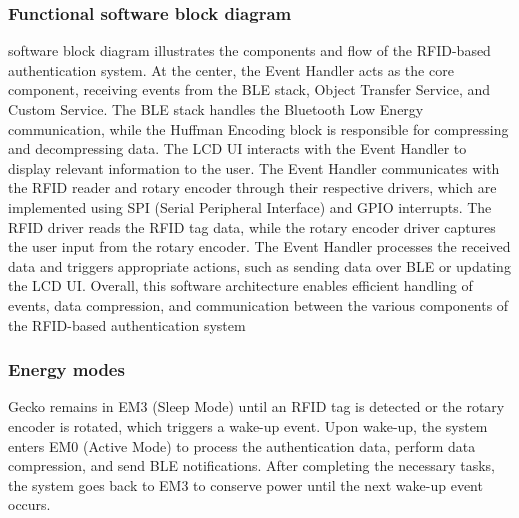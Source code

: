 \documentclass[a4paper,11pt]{article}%
\begin{document}

\subsubsection{Functional software block diagram}


software block diagram illustrates the components and flow of the RFID-based authentication system. At the center, the Event Handler acts as the core component, receiving events from the BLE stack, Object Transfer Service, and Custom Service. The BLE stack handles the Bluetooth Low Energy communication, while the Huffman Encoding block is responsible for compressing and decompressing data. The LCD UI interacts with the Event Handler to display relevant information to the user. The Event Handler communicates with the RFID reader and rotary encoder through their respective drivers, which are implemented using SPI (Serial Peripheral Interface) and GPIO interrupts. The RFID driver reads the RFID tag data, while the rotary encoder driver captures the user input from the rotary encoder. The Event Handler processes the received data and triggers appropriate actions, such as sending data over BLE or updating the LCD UI. Overall, this software architecture enables efficient handling of events, data compression, and communication between the various components of the RFID-based authentication system



\subsubsection{Energy modes}


Gecko remains in EM3 (Sleep Mode) until an RFID tag is detected or the rotary encoder is rotated, which triggers a wake-up event. Upon wake-up, the system enters EM0 (Active Mode) to process the authentication data, perform data compression, and send BLE notifications. After completing the necessary tasks, the system goes back to EM3 to conserve power until the next wake-up event occurs.
\end{document}
